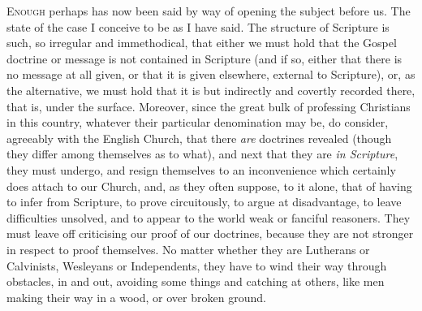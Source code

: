 E\textsc{nough} perhaps has now been said by way of opening the
subject before us. The state of the case I conceive to be as I have
said. The structure of Scripture is such, so irregular and
immethodical, that either we must hold that the Gospel doctrine or
message is not contained in Scripture (and if so, either that there is
no message at all given, or that it is given elsewhere, external to
Scripture), or, as the alternative, we must hold that it is but
indirectly and covertly recorded there, that is, under the surface.
Moreover, since the great bulk of professing Christians in this
country, whatever their particular denomination may be, do consider,
agreeably with the English Church, that there \emph{are} doctrines
revealed (though they differ among themselves as to what), and next
that they are \emph{in Scripture}, they must undergo, and resign
themselves to an inconvenience which certainly does attach to our
Church, and, as they often suppose, to it alone, that of having to
infer from Scripture, to prove circuitously, to argue at disadvantage,
to leave difficulties unsolved, and to appear to the world weak or
fanciful reasoners. They must leave off criticising our proof of our
doctrines, because they are not stronger in respect to proof
themselves. No matter whether they are Lutherans or Calvinists,
Wesleyans or Independents, they have to wind their way through
obstacles, in and out, avoiding some things and catching at others,
like men making their way in a wood, or over broken ground.

